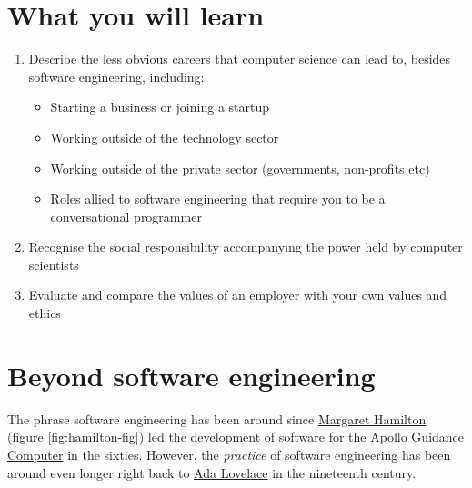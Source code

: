 \documentclass[
]{book}
\providecommand{\tightlist}{%
  \setlength{\itemsep}{0pt}\setlength{\parskip}{0pt}}
\begin{document}
\hypertarget{ilo11}{%
\section{What you will learn}\label{ilo11}}

\begin{enumerate}
\def\labelenumi{\arabic{enumi}.}
\tightlist
\item
  Describe the less obvious careers that computer science can lead to, besides software engineering, including:

  \begin{itemize}
  \tightlist
  \item
    Starting a business or joining a startup
  \item
    Working outside of the technology sector
  \item
    Working outside of the private sector (governments, non-profits etc)
  \item
    Roles allied to software engineering that require you to be a conversational programmer
  \end{itemize}
\item
  Recognise the social responsibility accompanying the power held by computer scientists
\item
  Evaluate and compare the values of an employer with your own values and ethics
\end{enumerate}

\hypertarget{otheroles}{%
\section{Beyond software engineering}\label{otheroles}}

The phrase software engineering has been around since \href{https://en.wikipedia.org/wiki/Margaret_Hamilton_(software_engineer)}{Margaret Hamilton} (figure \ref{fig:hamilton-fig}) led the development of software for the \href{https://en.wikipedia.org/wiki/Apollo_Guidance_Computer}{Apollo Guidance Computer} in the sixties. However, the \emph{practice} of software engineering has been around even longer right back to \href{https://en.wikipedia.org/wiki/Ada_Lovelace}{Ada Lovelace} in the nineteenth century.
\end{document}
